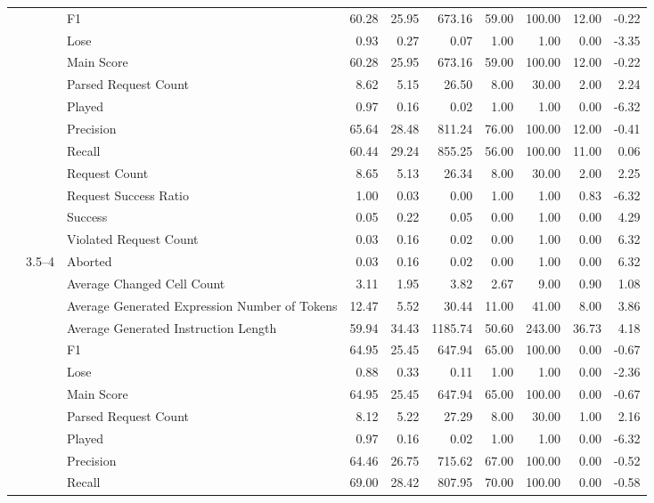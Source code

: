\begin{tabular}{lllrrrrrrr}
 &  & F1 & 60.28 & 25.95 & 673.16 & 59.00 & 100.00 & 12.00 & -0.22 \\
 &  & Lose & 0.93 & 0.27 & 0.07 & 1.00 & 1.00 & 0.00 & -3.35 \\
 &  & Main Score & 60.28 & 25.95 & 673.16 & 59.00 & 100.00 & 12.00 & -0.22 \\
 &  & Parsed Request Count & 8.62 & 5.15 & 26.50 & 8.00 & 30.00 & 2.00 & 2.24 \\
 &  & Played & 0.97 & 0.16 & 0.02 & 1.00 & 1.00 & 0.00 & -6.32 \\
 &  & Precision & 65.64 & 28.48 & 811.24 & 76.00 & 100.00 & 12.00 & -0.41 \\
 &  & Recall & 60.44 & 29.24 & 855.25 & 56.00 & 100.00 & 11.00 & 0.06 \\
 &  & Request Count & 8.65 & 5.13 & 26.34 & 8.00 & 30.00 & 2.00 & 2.25 \\
 &  & Request Success Ratio & 1.00 & 0.03 & 0.00 & 1.00 & 1.00 & 0.83 & -6.32 \\
 &  & Success & 0.05 & 0.22 & 0.05 & 0.00 & 1.00 & 0.00 & 4.29 \\
 &  & Violated Request Count & 0.03 & 0.16 & 0.02 & 0.00 & 1.00 & 0.00 & 6.32 \\
\cline{2-10}
 & \multirow[t]{15}{*}{3.5--4} & Aborted & 0.03 & 0.16 & 0.02 & 0.00 & 1.00 & 0.00 & 6.32 \\
 &  & Average Changed Cell Count & 3.11 & 1.95 & 3.82 & 2.67 & 9.00 & 0.90 & 1.08 \\
 &  & Average Generated Expression Number of Tokens & 12.47 & 5.52 & 30.44 & 11.00 & 41.00 & 8.00 & 3.86 \\
 &  & Average Generated Instruction Length & 59.94 & 34.43 & 1185.74 & 50.60 & 243.00 & 36.73 & 4.18 \\
 &  & F1 & 64.95 & 25.45 & 647.94 & 65.00 & 100.00 & 0.00 & -0.67 \\
 &  & Lose & 0.88 & 0.33 & 0.11 & 1.00 & 1.00 & 0.00 & -2.36 \\
 &  & Main Score & 64.95 & 25.45 & 647.94 & 65.00 & 100.00 & 0.00 & -0.67 \\
 &  & Parsed Request Count & 8.12 & 5.22 & 27.29 & 8.00 & 30.00 & 1.00 & 2.16 \\
 &  & Played & 0.97 & 0.16 & 0.02 & 1.00 & 1.00 & 0.00 & -6.32 \\
 &  & Precision & 64.46 & 26.75 & 715.62 & 67.00 & 100.00 & 0.00 & -0.52 \\
 &  & Recall & 69.00 & 28.42 & 807.95 & 70.00 & 100.00 & 0.00 & -0.58 \\

\end{tabular}
